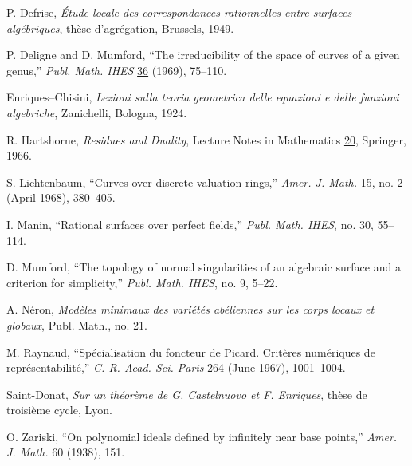 \begin{description}[leftmargin=1.1cm,labelwidth=.8cm,labelsep=.3cm]
\item[{[1]}] P. Defrise, \textit{Étude locale des correspondances rationnelles
entre surfaces algébriques}, thèse d'agrégation, Brussels, 1949.

\item[{[2]}] P. Deligne and D. Mumford, ``The irreducibility of the space of
curves of a given genus,'' \textit{Publ. Math. IHES} \underline{36} (1969),
75--110.

\item[{[3]}] Enriques--Chisini, \textit{Lezioni sulla teoria geometrica delle
equazioni e delle funzioni algebriche}, Zanichelli, Bologna, 1924.

\item[{[4]}] R. Hartshorne, \textit{Residues and Duality}, Lecture Notes in
Mathematics \underline{20}, Springer, 1966.

\item[{[5]}] S. Lichtenbaum, ``Curves over discrete valuation rings,''
\textit{Amer. J. Math.} 15, no. 2 (April 1968), 380--405.

\item[{[6]}] I. Manin, ``Rational surfaces over perfect fields,''
\textit{Publ. Math. IHES}, no. 30, 55--114.

\item[{[7]}] D. Mumford, ``The topology of normal singularities of an
algebraic surface and a criterion for simplicity,'' \textit{Publ. Math. IHES},
no. 9, 5--22.

\item[{[8]}] A. Néron, \textit{Modèles minimaux des variétés abéliennes sur
les corps locaux et globaux}, Publ. Math., no. 21.


\item[{[9]}] M. Raynaud, ``Spécialisation du foncteur de Picard. Critères
numériques de représentabilité,'' \textit{C. R. Acad. Sci. Paris} 264
(June 1967), 1001--1004.

\item[{[10]}] Saint-Donat, \textit{Sur un théorème de G. Castelnuovo et
F. Enriques}, thèse de troisième cycle, Lyon.

\item[{[11]}] O. Zariski, ``On polynomial ideals defined by infinitely near
base points,'' \textit{Amer. J. Math.} 60 (1938), 151.


\end{description}
